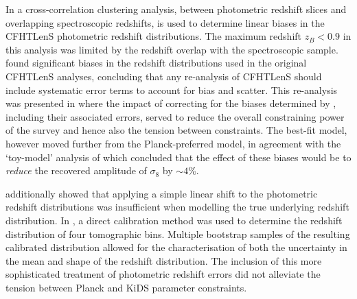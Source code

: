 In \citet{choi/etal:2016} a cross-correlation clustering analysis, between photometric redshift slices and overlapping spectroscopic redshifts, is used to determine linear biases in the CFHTLenS photometric redshift distributions.   The maximum redshift $z_B<0.9$ in this analysis was limited by the redshift overlap with the spectroscopic sample.  \citet{choi/etal:2016} found significant biases in the redshift distributions used in the original CFHTLenS analyses,
concluding that any re-analysis of CFHTLenS should include systematic error terms to account for bias and scatter.    This re-analysis was presented in \citet{joudaki/etal:2016} where the impact of correcting for the biases determined by \citet{choi/etal:2016}, including their associated errors, served to reduce the overall constraining power of the survey and hence also the tension between constraints.  The best-fit model, however moved further from the Planck-preferred model, in agreement with the `toy-model' analysis of \citet{choi/etal:2016} which concluded that the effect of these biases would be to {\it reduce} the recovered amplitude of $\sigma_8$ by $\sim 4$\%. 

\citet{choi/etal:2016} additionally showed that applying a simple linear shift to the photometric redshift distributions was insufficient when modelling the true underlying redshift distribution.  In \citet{hildebrandt/etal:2016}, a direct calibration method was used to determine the redshift distribution of four tomographic bins.  Multiple bootstrap samples of the resulting calibrated distribution allowed for the characterisation of both the uncertainty in the mean and shape of the redshift distribution.  The inclusion of this more sophisticated treatment of photometric redshift errors did not alleviate the tension between Planck and KiDS parameter constraints.

